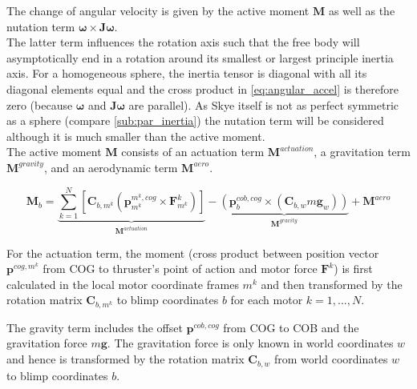 The change of angular velocity is given by the active moment $\mathbf{M}$ as well as the nutation term $\boldsymbol{\omega} \times \mathbf{J} \boldsymbol{\omega}$.
\\
The latter term influences the rotation axis such that the free body will asymptotically end in a rotation around its smallest or largest principle inertia axis.
For a homogeneous sphere, the inertia tensor is diagonal with all its diagonal elements equal and the cross product in \cref{eq:angular_accel} is therefore zero (because $\boldsymbol{\omega}$ and $\mathbf{J}\boldsymbol{\omega}$ are parallel).
As Skye itself is not as perfect symmetric as a sphere (compare \cref{sub:par_inertia}) the nutation term will be considered although it is much smaller than the active moment.
\\
The active moment $\mathbf{M}$ consists of an actuation term $\mathbf{M}^{actuation}$, a gravitation term $\mathbf{M}^{gravity}$, and an aerodynamic term $\mathbf{M}^{aero}$.

\begin{equation}
\label{eq:moments}
\mathbf{M}_b = \underbrace{\sum_{k=1}^N  \left[  \mathbf{C}_{b,m^k} \left( \mathbf{p}^{m^k,cog}_{m^k} \times \mathbf{F}^k_{m^k} \right)  \right]}_{\mathbf{M}^{actuation}}
-
\underbrace{
 \left( \mathbf{p}^{cob,cog}_b \times (\mathbf{C}_{b,w}m\mathbf{g}_w) \right)
}_{\mathbf{M}^{gravity}}
+
\mathbf{M}^{aero}
\end{equation}

For the actuation term, the moment
(cross product between position vector $\mathbf{p}^{cog,m^k}$ from COG to thruster's point of action and motor force $\mathbf{F}^k$)
is first calculated in the local motor coordinate frames $m^k$ and then transformed by the rotation matrix $\mathbf{C}_{b,m^k}$ to blimp coordinates $b$ for each motor $k=1,...,N$.

The gravity term includes the offset $\mathbf{p}^{cob,cog}$ from COG to COB and 
the gravitation force $m\mathbf{g}$. The gravitation force is only known in world coordinates $w$ and hence is transformed by the rotation matrix $\mathbf{C}_{b,w}$ from world coordinates $w$ to blimp coordinates $b$.

